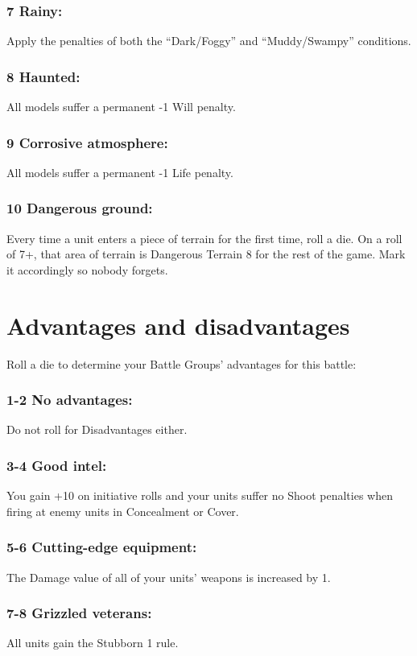 \begin{multicols}{2}
\subsubsection*{7 Rainy:} Apply the penalties of both the ``Dark/Foggy'' and ``Muddy/Swampy'' conditions.

\subsubsection*{8 Haunted:} All models suffer a permanent -1 Will penalty.

\subsubsection*{9 Corrosive atmosphere:} All models suffer a permanent -1 Life penalty.

\subsubsection*{10 Dangerous ground:} Every time a unit enters a piece of terrain for the first time, roll a die. On a roll of 7+, that area of terrain is Dangerous Terrain 8 for the rest of the game. Mark it accordingly so nobody forgets.




\section*{Advantages and disadvantages}
Roll a die to determine your Battle Groups' advantages for this battle:
\subsubsection*{1-2 No advantages:} Do not roll for Disadvantages either.

\subsubsection*{3-4 Good intel:} You gain +10 on initiative rolls and your units suffer no Shoot penalties when firing at enemy units in Concealment or Cover.

\subsubsection*{5-6 Cutting-edge equipment:} The Damage value of all of your units' weapons is increased by 1.

\subsubsection*{7-8 Grizzled veterans:} All units gain the Stubborn 1 rule.


\end{multicols}
